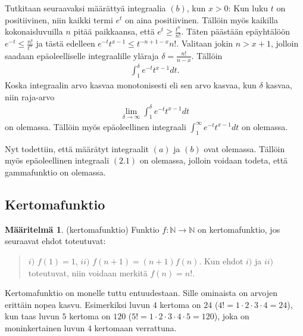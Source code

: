 \documentclass[12pt]{article}
\theoremstyle{definition}
\newtheorem{maar}{Määritelmä}
\theoremstyle{plain}
\numberwithin{equation}{section}
\begin{document}
Tutkitaan seuraavaksi määrättyä integraalia $(b)$, kun $x>0$: \newline
Kun luku $t$ on positiivinen, niin kaikki termi $e^t$ on aina positiivinen. Tällöin myös kaikilla kokonaisluvuilla $n$ pitää paikkaansa, että $e^t\ge\frac{t^n}{n!}$. Täten päästään epäyhtälöön $e^{-t}\le\frac{n!}{t^n}$ ja tästä edelleen $e^{-t}t^{x-1}\le{t^{-{n+1-x}}}{n!}$. Valitaan jokin $n>x+1$, jolloin saadaan epäoleelliselle integraalille yläraja $\delta=\frac{n!}{n-x}$. Tällöin
\begin{align*}
    \int_1^{\delta}e^{-t}t^{x-1}dt.
\end{align*}
Koska integraalin arvo kasvaa monotonisesti eli sen arvo kasvaa, kun $\delta$ kasvaa, niin raja-arvo 
\begin{align*}
    \lim_{\delta\to\infty}\int_1^{\delta}e^{-t}t^{x-1}dt
\end{align*}
on olemassa. Tällöin myös epäoleellinen integraali $\int_1^{\infty}e^{-t}t^{x-1}dt$ on olemassa.

Nyt todettiin, että määrätyt integraalit $(a)$ ja $(b)$ ovat olemassa. Tällöin myös epäoleellinen integraali $(2.1)$ on olemassa, jolloin voidaan todeta, että gammafunktio on olemassa.



\subsection{Kertomafunktio}
\begin{maar}
(kertomafunktio)
Funktio $f: \mathbb{N} \rightarrow \mathbb{N}$ on kertomafunktio, jos seuraavat ehdot toteutuvat:
\begin{quote}
    $i)$ $f(1)=1$, \newline
    $ii)$ $f(n+1)=(n+1)f(n)$. \newline
    Kun ehdot $i)$ ja $ii)$ toteutuvat, niin voidaan merkitä $f(n)=n!$.
\end{quote}
\end{maar}
Kertomafunktio on monelle tuttu entuudestaan. Sille ominaista on arvojen erittäin nopea kasvu. Esimerkiksi luvun $4$ kertoma on $24$ ($4! = 1\cdot 2\cdot3\cdot4=24$), kun taas luvun $5$ kertoma on $120$ ($5! = 1\cdot2\cdot3\cdot4\cdot5=120$), joka on moninkertainen luvun $4$ kertomaan verrattuna.
\end{document}
